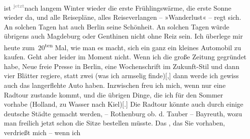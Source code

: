 \begin{ledgroupsized}[t]{13cm}
               ist \substVorne{}\textsuperscript{\textcolor{gray}{jetzt}}\substDazwischen{}nach\substHinten{} langem Winter wieder die erste Frühlingswärme, die erste Sonne wieder da,
               und alle Reisepläne, alles Reiseverlangen – »Wanderlust« – regt sich. An solchen
               Tagen hat auch Berlin seine Schönheit. An solchen
               Tagen würde übrigens auch Magdeburg oder Genthinen nicht ohne Reiz sein. Ich überlege mir
               heute zum 20\textsuperscript{ten} Mal, wie man es macht, sich ein ganz ein
               kleines Automobil zu kaufen. Geht aber leider im Moment nicht. Wenn ich die große
               Zeitung gegründet habe, Neue freie Presse in Berlin, eine Wochenschrift im Zukunft-Stil und dann vier Blätter regiere, statt zwei (was ich armselig
                  finde){[},{]} dann werde ich gewiss auch das langerflehte Auto
               haben. Inzwischen freu ich mich, wenn nur eine Radtour zustande kommt, und die
               übrigen Dinge, die ich für den Sommer vorhabe (Holland, zu Wasser nach Kiel){[}.{]} Die Radtour könnte auch durch einige deutsche Städte gemacht werden,
               – Rothenburg ob. d. Tauber – Bayreuth, wozu man freilich jetzt schon die Sitze bestellen
               müsste. Das \label{K_L03416-3v}\label{K_L03416-3h}, das Sie vorhaben, verdrießt mich – wenn ich

\end{ledgroupsized}
